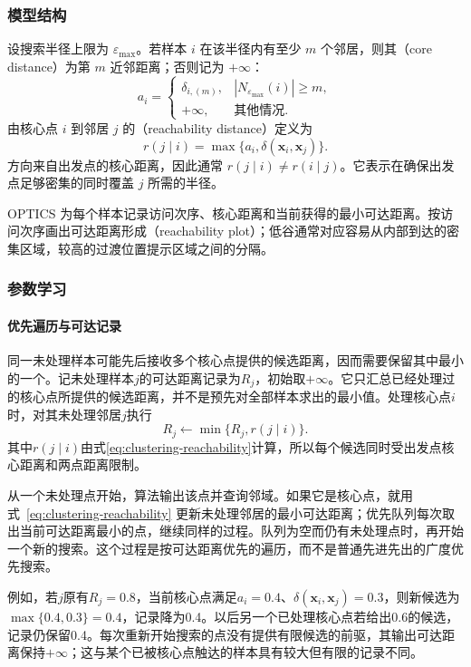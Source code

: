 \subsubsection{模型结构}

设搜索半径上限为 $\varepsilon_{\max}$。若样本 $i$ 在该半径内有至少 $m$ 个邻居，则其（core distance）为第 $m$ 近邻距离；否则记为 $+\infty$：
\[
 a_i=
 \begin{cases}
 \delta_{i,(m)},&|N_{\varepsilon_{\max}}(i)|\geq m,\\
 +\infty,&\text{其他情况}.
 \end{cases}
\]
由核心点 $i$ 到邻居 $j$ 的（reachability distance）定义为
\begin{equation}
 r(j\mid i)=\max\{a_i,\delta(\bm{x}_i,\bm{x}_j)\}.
 \label{eq:clustering-reachability}
\end{equation}
方向来自出发点的核心距离，因此通常 $r(j\mid i)\ne r(i\mid j)$。它表示在确保出发点足够密集的同时覆盖 $j$ 所需的半径。

OPTICS 为每个样本记录访问次序、核心距离和当前获得的最小可达距离。按访问次序画出可达距离形成（reachability plot）；低谷通常对应容易从内部到达的密集区域，较高的过渡位置提示区域之间的分隔。

\subsubsection{参数学习}

\paragraph{优先遍历与可达记录}

同一未处理样本可能先后接收多个核心点提供的候选距离，因而需要保留其中最小的一个。记未处理样本$j$的可达距离记录为$R_j$，初始取$+\infty$。它只汇总已经处理过的核心点所提供的候选距离，并不是预先对全部样本求出的最小值。处理核心点$i$时，对其未处理邻居$j$执行
\[
 R_j\leftarrow\min\{R_j,r(j\mid i)\}.
\]
其中$r(j\mid i)$由式\eqref{eq:clustering-reachability}计算，所以每个候选同时受出发点核心距离和两点距离限制。

从一个未处理点开始，算法输出该点并查询邻域。如果它是核心点，就用式~\eqref{eq:clustering-reachability} 更新未处理邻居的最小可达距离；优先队列每次取出当前可达距离最小的点，继续同样的过程。队列为空而仍有未处理点时，再开始一个新的搜索。这个过程是按可达距离优先的遍历，而不是普通先进先出的广度优先搜索。

例如，若$j$原有$R_j=0.8$，当前核心点满足$a_i=0.4$、$\delta(\bm{x}_i,\bm{x}_j)=0.3$，则新候选为$\max\{0.4,0.3\}=0.4$，记录降为0.4。以后另一个已处理核心点若给出0.6的候选，记录仍保留0.4。每次重新开始搜索的点没有提供有限候选的前驱，其输出可达距离保持$+\infty$；这与某个已被核心点触达的样本具有较大但有限的记录不同。

